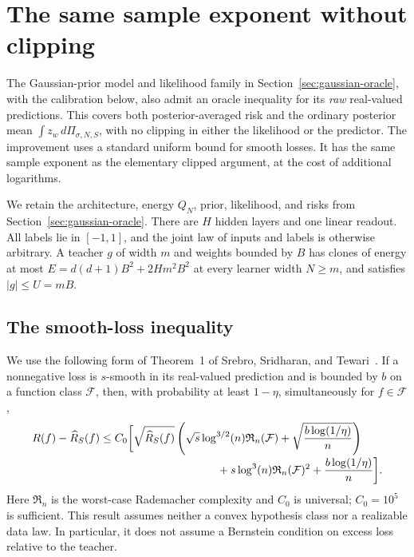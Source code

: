 \section{The same sample exponent without clipping}
\label{sec:raw-gaussian-oracle}

The Gaussian-prior model and likelihood family in Section~\ref{sec:gaussian-oracle}, with the calibration below, also admit
an oracle inequality for its \emph{raw} real-valued predictions.  This
covers both posterior-averaged risk and the ordinary posterior mean
$\int z_w\,d\Pi_{\sigma,N,S}$, with no clipping in either the likelihood
or the predictor.  The improvement uses a standard uniform bound for
smooth losses.  It has the same sample exponent as the elementary
clipped argument, at the cost of additional logarithms.

We retain the architecture, energy $Q_N$, prior, likelihood, and risks
from Section~\ref{sec:gaussian-oracle}.  There are $H$ hidden layers and
one linear readout.  All labels lie in $[-1,1]$, and the joint law of
inputs and labels is otherwise arbitrary.  A teacher $g$ of width $m$
and weights bounded by $B$ has clones of energy at most
$E=d(d+1)B^2+2Hm^2B^2$ at every learner width $N\geq m$, and satisfies
$|g|\leq U=mB$.

\subsection{The smooth-loss inequality}

We use the following form of Theorem~1 of
Srebro, Sridharan, and Tewari~\cite[Theorem~1, p.~4 of the full-length version]{sst}.  If a nonnegative loss is
$s$-smooth in its real-valued prediction and is bounded by $b$ on a
function class $\mathcal F$, then, with probability at least $1-\eta$,
simultaneously for $f\in\mathcal F$,
\begin{align}
 R(f)-\widehat R_S(f)
 &\leq C_0\biggl[
  \sqrt{\widehat R_S(f)}
    \left(\sqrt{s}\log^{3/2}(n)\mathfrak R_n(\mathcal F)
           +\sqrt{\frac{b\log(1/\eta)}n}\right)
 \notag\\[-2pt]
 &\hspace{37mm}
  +s\log^3(n)\mathfrak R_n(\mathcal F)^2
  +\frac{b\log(1/\eta)}n\biggr].
 \label{eq:raw-sst}
\end{align}
Here $\mathfrak R_n$ is the worst-case Rademacher complexity and $C_0$ is
universal; $C_0=10^5$ is sufficient.  This result assumes neither a convex
hypothesis class nor a realizable data law.  In particular, it does not
assume a Bernstein condition on excess loss relative to the teacher.

